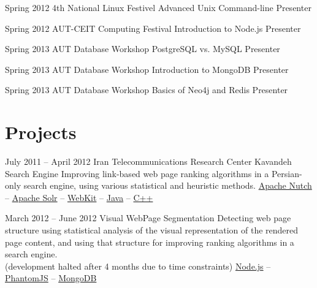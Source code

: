 \documentclass{tccv}
\begin{document}
{{\begin{teaching}


\item{Spring 2012}
	 {4th National Linux Festivel}
	 {Advanced Unix Command-line}
	 {Presenter}


\item{Spring 2012}
	 {AUT-CEIT Computing Festival}
	 {Introduction to Node.js}
	 {Presenter}


\item{Spring 2013}
	 {AUT Database Workshop}
	 {PostgreSQL vs. MySQL}
	 {Presenter}


\item{Spring 2013}
	 {AUT Database Workshop}
	 {Introduction to MongoDB}
	 {Presenter}


\item{Spring 2013}
	 {AUT Database Workshop}
	 {Basics of Neo4j and Redis}
	 {Presenter}

\end{teaching}










\section{Projects}

\begin{project_list}

\item{July 2011 -- April 2012}
     {Iran Telecommunications Research Center}
     {Kavandeh Search Engine}
	 {Improving link-based web page ranking algorithms in a Persian-only search engine, using various statistical and heuristic methods.}
     {
     	\href{http://nutch.apache.org}{Apache Nutch} -- 
		\href{http://lucene.apache.org/solr/}{Apache Solr} -- 
		\href{http://www.webkit.org}{WebKit} -- 
		\href{http://www.oracle.com/technetwork/java/}{Java} -- 
		\href{https://en.wikipedia.org/wiki/C\%2B\%2B}{C++}
	}

\vspace{5pt}

\item{March 2012 -- June 2012}
     {}
     {Visual WebPage Segmentation}
	 {Detecting web page structure using statistical analysis of the visual representation of the rendered page content, and using that structure for improving ranking algorithms in a search engine.\\
(development halted after 4 months due to time constraints)}
	 {
	 	\href{http://nodejs.org}{Node.js} -- 
		\href{http://phantomjs.org}{PhantomJS} -- 
		\href{http://www.mongodb.org}{MongoDB}
	 }



\end{project_list}}}
\end{document}
